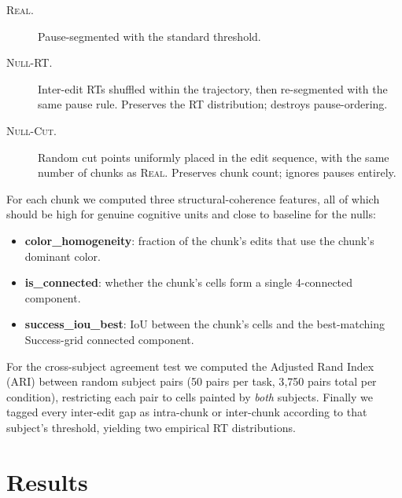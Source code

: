 \documentclass[11pt]{article}
\begin{document}
\begin{description}
  \item[\textsc{Real}.] Pause-segmented with the standard threshold.
  \item[\textsc{Null-RT}.] Inter-edit RTs shuffled within the trajectory,
    then re-segmented with the same pause rule. Preserves the RT
    distribution; destroys pause-ordering.
  \item[\textsc{Null-Cut}.] Random cut points uniformly placed in the
    edit sequence, with the same number of chunks as \textsc{Real}.
    Preserves chunk count; ignores pauses entirely.
\end{description}

For each chunk we computed three structural-coherence features, all of
which should be high for genuine cognitive units and close to baseline
for the nulls:

\begin{itemize}
  \item \textbf{color\_homogeneity}: fraction of the chunk's edits that
    use the chunk's dominant color.
  \item \textbf{is\_connected}: whether the chunk's cells form a single
    4-connected component.
  \item \textbf{success\_iou\_best}: IoU between the chunk's cells and
    the best-matching Success-grid connected component.
\end{itemize}

For the cross-subject agreement test we computed the Adjusted Rand
Index (ARI) between random subject pairs (50 pairs per task, 3{,}750
pairs total per condition), restricting each pair to cells painted by
\emph{both} subjects. Finally we tagged every inter-edit gap as
intra-chunk or inter-chunk according to that subject's threshold,
yielding two empirical RT distributions.

\section*{Results}
\end{document}
